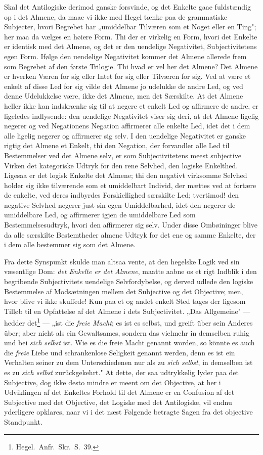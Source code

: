 \documentclass[12pt]{book}
\newcommand{\opage}[1]{\marginnote{\footnotesize\textit{[#1]}}}
\begin{document}
Skal det Antilogiske derimod ganske forsvinde, og det Enkelte gaae fuldstændig op i det
Almene, da maae vi ikke med Hegel tænke paa de grammatiske Subjecter, hvori Begrebet har
„umiddelbar Tilværen som et Noget eller en Ting"; her maa da vælges en høiere Form. Thi der
er virkelig en Form, hvori det Enkelte er identisk med det Almene, og det er den uendelige
Negativitet, Subjectivitetens egen Form. Ifølge den uendelige Negativitet kommer det Almene
allerede frem som Begrebet af den første Trilogie. Thi hvad er vel her det Almene? Det Almene
er hverken Væren for sig eller Intet for sig eller Tilværen for sig. Ved at være et enkelt af
disse Led for sig vilde det Almene jo udelukke de andre Led, og ved denne Udelukkelse være,
ikke det Almene, men det Særskilte. At det Almene heller ikke kan indskrænke sig til at negere
et enkelt Led og affirmere de andre, er ligeledes indlysende: den uendelige Negativitet viser
sig deri, at det Almene ligelig negerer og ved Negationens Negation affirmerer alle enkelte
Led, idet det i dem alle ligelig negerer og affirmerer sig selv. I den uendelige Negativitet
er ganske rigtig det Almene et Enkelt, thi den Negation, der forvandler alle Led til
Bestemmelser ved det Almene selv, er som Subjectivitetens meest subjective Virken det
kategoriske Udtryk for den rene Selvhed, den logiske Enkelthed. Ligesaa er det logisk Enkelte
det Almene; thi den negativt virksomme Selvhed holder sig ikke tilværende som et umiddelbart
Individ, der mættes ved at fortære de enkelte, ved deres indbyrdes Forskiellighed særskilte
Led; tvertimod! den negative Selvhed negerer just sin egen Umiddelbarhed, idet den negerer de
\opage{155} umiddelbare Led, og affirmerer igjen de umiddelbare Led som Bestemmelsesudtryk, hvori den
affirmerer sig selv. Under disse Ombøininger blive da alle særskilte Bestemtheder almene Udtryk
for det ene og samme Enkelte, der i dem alle bestemmer sig som det Almene.

Fra dette Synspunkt skulde man altsaa vente, at den hegelske Logik ved sin væsentlige Dom:
\emph{det Enkelte er det Almene}, maatte aabne os et rigt Indblik i den begribende
Subjectivitets uendelige Selvfordybelse, og derved udlede den logiske Bestemmelse af
Modsætningen mellem det Subjective og det Objective; men, hvor blive vi ikke skuffede! Kun paa
et og andet enkelt Sted tages der ligesom Tilløb til en Opfattelse af det Almene i dets
Subjectivitet. „Das Allgemeine" --- hedder det\footnote{Hegel.\ Anfr.\ Skr.\ S.~39.} --- „ist
die \emph{freie Macht}; es ist es selbst, und greift über sein Anderes über; aber nicht als ein
Gewaltsames, sondern das vielmehr in demselben ruhig und bei \emph{sich selbst} ist. Wie es die
freie Macht genannt worden, so könnte es auch die \emph{freie} Liebe und schrankenlose
Seligkeit genannt werden, denn es ist ein Verhalten seiner zu dem Unterschiedenen nur als zu
\emph{sich selbst}, in demselben ist es zu \emph{sich selbst} zurückgekehrt." At dette, der saa
udtrykkelig lyder paa det Subjective, dog ikke desto mindre er meent om det Objective, at her i
Udviklingen af det Enkeltes Forhold til det Almene er en Confusion af det Subjective med det
Objective, det Logiske med det Antilogiske, vil endnu yderligere opklares, naar vi i det næst
Følgende betragte Sagen fra det objective Standpunkt.
\end{document}
